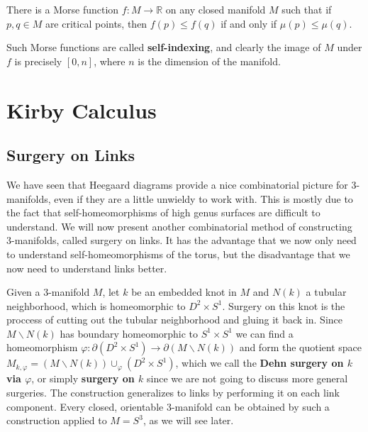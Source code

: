 
\begin{thm}
\label{existence of self-indexing Morse functions}
There is a Morse function $f : M \rightarrow \mathbb R$ on any closed manifold $M$ such that if $p,q \in M$ are critical points, then $f(p) \leq f(q)$ if and only if $\mu(p) \leq \mu(q)$.
\end{thm}

Such Morse functions are called \textbf{self-indexing}, and clearly the image of $M$ under $f$ is precisely $[0,n]$, where $n$ is the dimension of the manifold. 









\newpage
\section{Kirby Calculus}
\label{Kirby Calculus}




\subsection{Surgery on Links}
\label{Surgery on Links}


We have seen that Heegaard diagrams provide a nice combinatorial picture for 3-manifolds, even if they are a little unwieldy to work with. This is mostly due to the fact that self-homeomorphisms of high genus surfaces are difficult to understand. We will now present another combinatorial method of constructing 3-manifolds, called surgery on links. It has the advantage that we now only need to understand self-homeomorphisms of the torus, but the disadvantage that we now need to understand links better.

Given a 3-manifold $M$, let $k$ be an embedded knot in $M$ and $N(k)$ a tubular neighborhood, which is homeomorphic to $D^2 \times S^1$. Surgery on this knot is the proccess of cutting out the tubular neighborhood and gluing it back in. Since $M \backslash N(k)$ has boundary homeomorphic to $S^1 \times S^1$ we can find a homeomorphism $\varphi : \partial(D^2 \times S^1) \rightarrow \partial (M \backslash N(k))$ and form the quotient space $M_{k,\varphi} = (M \backslash N(k)) \cup_\varphi (D^2 \times S^1)$, which we call the \textbf{Dehn surgery on $k$ via $\varphi$}, or simply \textbf{surgery on $k$} since we are not going to discuss more general surgeries. The construction generalizes to links by performing it on each link component. Every closed, orientable 3-manifold can be obtained by such a construction applied to $M=S^3$, as we will see later.


